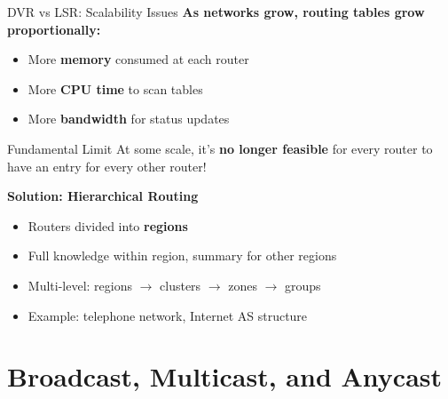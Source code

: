 \documentclass[aspectratio=169,11pt]{beamer}
\begin{document}
\begin{frame}{DVR vs LSR: Scalability Issues}
    \textbf{As networks grow, routing tables grow proportionally:}
    
    \vspace{0.3cm}
    \begin{itemize}
        \item More \textbf{memory} consumed at each router
        \item More \textbf{CPU time} to scan tables
        \item More \textbf{bandwidth} for status updates
    \end{itemize}
    
    \vspace{0.3cm}
    \begin{alertblock}{Fundamental Limit}
        At some scale, it's \textbf{no longer feasible} for every router to have an entry for every other router!
    \end{alertblock}
    
    \vspace{0.3cm}
    \textbf{Solution: Hierarchical Routing}
    \begin{itemize}
        \item Routers divided into \textbf{regions}
        \item Full knowledge within region, summary for other regions
        \item Multi-level: regions $\rightarrow$ clusters $\rightarrow$ zones $\rightarrow$ groups
        \item Example: telephone network, Internet AS structure
    \end{itemize}
\end{frame}

\section{Broadcast, Multicast, and Anycast}
\end{document}
